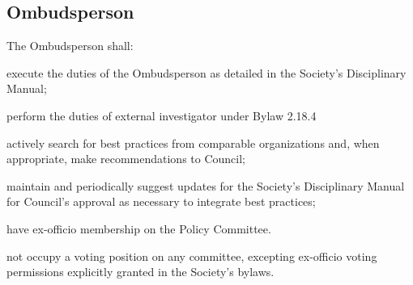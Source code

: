 \subsection{Ombudsperson}
\begin{longenum}[ label*=\thesubsection.\arabic*., align=left]
	\item The Ombudsperson shall: 
    \begin{longenum}[ label*=\arabic*., align=left]
\item execute the duties of the Ombudsperson as detailed in the Society's Disciplinary Manual; 
\item perform the duties of external investigator under Bylaw 2.18.4
\item actively search for best practices from comparable organizations and, when appropriate, make recommendations to Council;
\item maintain and periodically suggest updates for the Society's Disciplinary Manual for Council's approval
as necessary to integrate best practices;
\item have ex-officio membership on the Policy Committee.
\item not occupy a voting position on any committee, excepting ex-officio voting permissions explicitly granted in the Society's bylaws.
\end{longenum}
\end{longenum}
